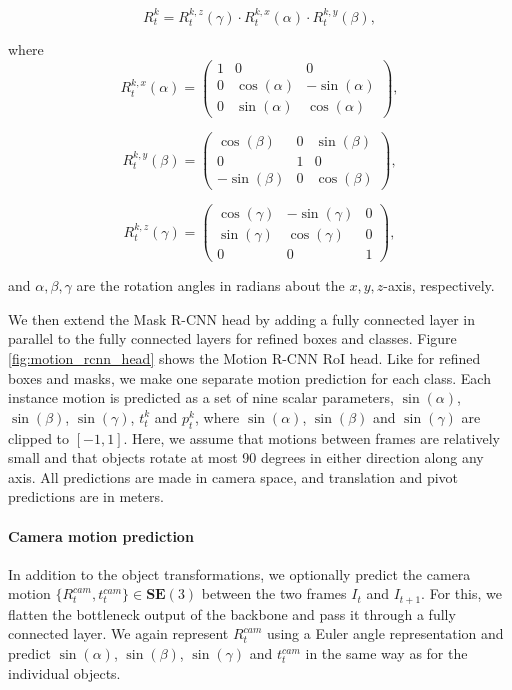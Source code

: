 \begin{equation}
R_t^k = R_t^{k,z}(\gamma) \cdot R_t^{k,x}(\alpha) \cdot R_t^{k,y}(\beta),
\end{equation}

where
\begin{equation}
R_t^{k,x}(\alpha) =
\begin{pmatrix}
  1 & 0 & 0 \\
  0 & \cos(\alpha) & -\sin(\alpha) \\
  0 & \sin(\alpha) & \cos(\alpha)
\end{pmatrix},
\end{equation}

\begin{equation}
R_t^{k,y}(\beta) =
\begin{pmatrix}
  \cos(\beta) & 0 & \sin(\beta) \\
  0 & 1 & 0 \\
  -\sin(\beta) & 0 & \cos(\beta)
\end{pmatrix},
\end{equation}

\begin{equation}
R_t^{k,z}(\gamma) =
\begin{pmatrix}
  \cos(\gamma) & -\sin(\gamma) & 0 \\
  \sin(\gamma) & \cos(\gamma) & 0 \\
  0 & 0 & 1
\end{pmatrix},
\end{equation}

and $\alpha, \beta, \gamma$ are the rotation angles in radians about the $x,y,z$-axis, respectively.

We then extend the Mask R-CNN head by adding a fully connected layer in parallel to the fully connected layers for
refined boxes and classes. Figure \ref{fig:motion_rcnn_head} shows the Motion R-CNN RoI head.
Like for refined boxes and masks, we make one separate motion prediction for each class.
Each instance motion is predicted as a set of nine scalar parameters,
$\sin(\alpha)$, $\sin(\beta)$, $\sin(\gamma)$, $t_t^k$ and $p_t^k$,
where $\sin(\alpha)$, $\sin(\beta)$ and $\sin(\gamma)$ are clipped to $[-1, 1]$.
Here, we assume that motions between frames are relatively small
and that objects rotate at most 90 degrees in either direction along any axis.
All predictions are made in camera space, and translation and pivot predictions are in meters.

\paragraph{Camera motion prediction}
In addition to the object transformations, we optionally predict the camera motion $\{R_t^{cam}, t_t^{cam}\}\in \mathbf{SE}(3)$
between the two frames $I_t$ and $I_{t+1}$.
For this, we flatten the bottleneck output of the backbone and pass it through a fully connected layer.
We again represent $R_t^{cam}$ using a Euler angle representation and
predict $\sin(\alpha)$, $\sin(\beta)$, $\sin(\gamma)$ and $t_t^{cam}$ in the same way as for the individual objects.


